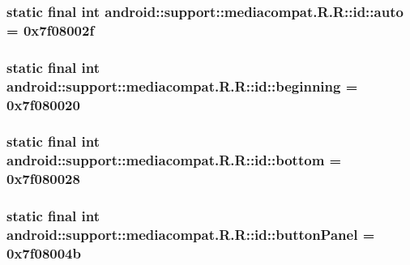 \hypertarget{classandroid_1_1support_1_1mediacompat_1_1_r_1_1id_3432a688456c9edf03496e5512e11344}{
\subsubsection[{auto}]{\setlength{\rightskip}{0pt plus 5cm}static final int android::support::mediacompat.R.R::id::auto = 0x7f08002f}}
\label{classandroid_1_1support_1_1mediacompat_1_1_r_1_1id_3432a688456c9edf03496e5512e11344}


\hypertarget{classandroid_1_1support_1_1mediacompat_1_1_r_1_1id_be0b2673d389ca2f13d83c25f31ef39d}{
\subsubsection[{beginning}]{\setlength{\rightskip}{0pt plus 5cm}static final int android::support::mediacompat.R.R::id::beginning = 0x7f080020}}
\label{classandroid_1_1support_1_1mediacompat_1_1_r_1_1id_be0b2673d389ca2f13d83c25f31ef39d}


\hypertarget{classandroid_1_1support_1_1mediacompat_1_1_r_1_1id_0968c27b33062c4f2eae074ab7601b2e}{
\subsubsection[{bottom}]{\setlength{\rightskip}{0pt plus 5cm}static final int android::support::mediacompat.R.R::id::bottom = 0x7f080028}}
\label{classandroid_1_1support_1_1mediacompat_1_1_r_1_1id_0968c27b33062c4f2eae074ab7601b2e}


\hypertarget{classandroid_1_1support_1_1mediacompat_1_1_r_1_1id_cae5cbac433f7e352603a62d70aeced4}{
\subsubsection[{buttonPanel}]{\setlength{\rightskip}{0pt plus 5cm}static final int android::support::mediacompat.R.R::id::buttonPanel = 0x7f08004b}}
\label{classandroid_1_1support_1_1mediacompat_1_1_r_1_1id_cae5cbac433f7e352603a62d70aeced4}


